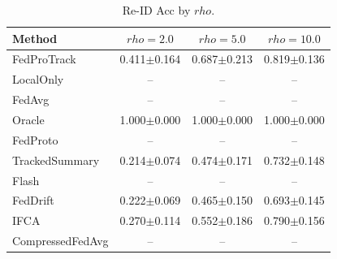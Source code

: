 \begin{table}[t]
\centering
\caption{Re-ID Acc by $rho$.}
\label{tab:rho_concept_re_id_accuracy}
\begin{tabular}{lccc}
\toprule
Method & $rho=2.0$ & $rho=5.0$ & $rho=10.0$ \\
\midrule
FedProTrack & 0.411$\pm$0.164 & 0.687$\pm$0.213 & 0.819$\pm$0.136 \\
LocalOnly & -- & -- & -- \\
FedAvg & -- & -- & -- \\
Oracle & 1.000$\pm$0.000 & 1.000$\pm$0.000 & 1.000$\pm$0.000 \\
FedProto & -- & -- & -- \\
TrackedSummary & 0.214$\pm$0.074 & 0.474$\pm$0.171 & 0.732$\pm$0.148 \\
Flash & -- & -- & -- \\
FedDrift & 0.222$\pm$0.069 & 0.465$\pm$0.150 & 0.693$\pm$0.145 \\
IFCA & 0.270$\pm$0.114 & 0.552$\pm$0.186 & 0.790$\pm$0.156 \\
CompressedFedAvg & -- & -- & -- \\
\bottomrule
\end{tabular}
\end{table}
